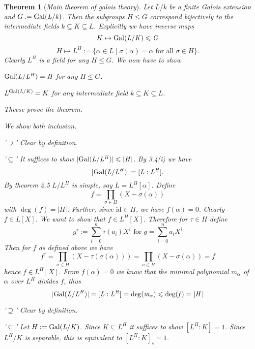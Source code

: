 \documentclass[11pt]{book}
\newtheorem{theorem}{Theorem}[section]
\theoremstyle{nonumberbreak}
\newenvironment{pr}[1][]{\ifthenelse{\equal{#1}{}}{\proof}{\proof[#1]}\rm}{\endproof}
\begin{document}
\begin{spacing}{1.3}
\begin{theorem}[\rm \it Main theorem of galois theory]     %
Let $L/k$ be a finite Galois extension and $G:=\rm{Gal}\it(L/k)$. Then the subgroups $H\leqslant G$ correspond bijectively to the intermediate fields $k \subseteq K \subseteq L$. Explicitly we have inverse maps
$$ K \mapsto \rm{Gal}\it(L/K) \leqslant G$$
$$ H \mapsto L^H := \{ \alpha \in L \mid \sigma(\alpha) =\alpha \textrm{ for all } \sigma \in H \}.$$
\begin{pr}
Clearly $L^H$ is a field for any $H \leqslant G$. We now have to show
\begin{compactenum}
\item $\rm{Gal}\it(L/L^H) = H$ for any $H \leqslant G$.
\item $L^{\rm{Gal}\it(L/K)} = K$ for any intermediate field $k \subseteq K \subseteq L$.
\end{compactenum}
Theese prove the theorem.
\begin{compactenum}
\item We show both inclusion.
\begin{compactitem}
\item['$\supseteq$'] Clear by definition.
\item['$\subseteq$'] It suffices to show $\vert \rm{Gal}\it(L/L^H) \vert \leqslant \vert H \vert$.
By 3.4(i) we have $$\vert \rm{Gal}\it(L/L^H) \vert = [L:L^H].$$By theorem 2.5 $L/L^H$ is simple, say $L=L^H[\alpha]$. Define $$f=\prod_{\sigma \in H} (X-\sigma(\alpha))$$ with $\deg(f)=\vert H \vert$. Further, since $\textrm{id} \in H$, we have $f(\alpha)=0$. Clearly $f \in L[X]$. We want to show that $f \in L^H[X]$. Therefore for $\tau \in H$ define $$g^{\tau}:=\sum_{i=0}^n \tau(a_i) X^{i} \textrm{ for }g=\sum_{i=0}^n a_i X^{i}$$Then for $f$ as defined above we have
$$f^{\tau}=\prod_{\sigma \in H} \left(X- \tau\left(\sigma(\alpha)\right)\right)=\prod_{\sigma \in H} \left(X- \sigma(\alpha)\right)=f$$
hence $f \in L^H[X]$. From $f(\alpha)=0$ we know that the minimal polynomial $m_{\alpha}$ of $\alpha$ over $L^H$ divides $f$, thus 
$$ \vert \rm{Gal}\it(L/L^H) \vert = [L:L^H] = \deg(m_{\alpha}) \leqslant \deg(f)= \vert H \vert $$
\end{compactitem}
\item
\begin{compactitem}
\item['$\supseteq$'] Clear by definition.
\item['$\subseteq$'] Let $H:= \rm{Gal}\it(L/K)$. Since $K \subseteq L^H$ it suffices to show $[L^{H}:K]=1$. Since $L^{H}/K$ is separable, this is equivalent to $[L^H:K]_s=1$.

\end{compactitem}
\end{compactenum}
\end{pr}
\end{theorem}
\end{spacing}
\end{document}
